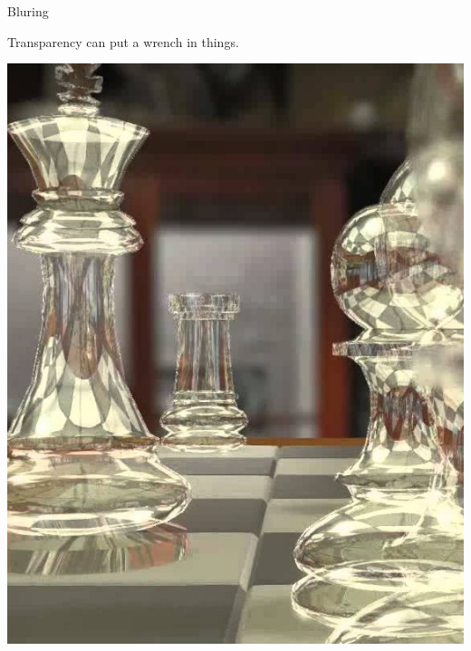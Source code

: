 \documentclass{lug}
\newcommand{\splitslide}[4]{
    \noindent
    \begin{minipage}{#1 \textwidth - #2 }
        #3
    \end{minipage}%
    \hspace{ \dimexpr #2 * 2 \relax }%
    \begin{minipage}{\textwidth - #1 \textwidth - #2 }
        #4
    \end{minipage}
}
\begin{document}
\begin{frame}{Bluring}
    \splitslide{0.65}{.7em}{
        \small

        Transparency can put a wrench in things.

    }{
        \includegraphics[width=\textwidth]{graphics/transparent}
    }
\end{frame}
\end{document}
